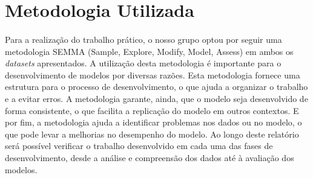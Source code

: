 \section{Metodologia Utilizada}
\paragraph{}
Para a realização do trabalho prático, o nosso grupo optou por seguir uma metodologia SEMMA (Sample, Explore, Modify, Model, Assess) em ambos os \textit{datasets} apresentados. A utilização desta metodologia é importante para o desenvolvimento de modelos por diversas razões. Esta metodologia fornece uma estrutura para o processo de desenvolvimento, o que ajuda a organizar o trabalho e a evitar erros. A metodologia garante, ainda, que o modelo seja desenvolvido de forma consistente, o que facilita a replicação do modelo em outros contextos. E por fim, a metodologia ajuda a identificar problemas nos dados ou no modelo, o que pode levar a melhorias no desempenho do modelo. Ao longo deste relatório será possível verificar o trabalho desenvolvido em cada uma das fases de desenvolvimento, desde a análise e compreensão dos dados até à avaliação dos modelos.
